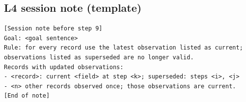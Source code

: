 \subsection{L4 session note (template)}
\begin{small}\begin{Verbatim}[breaklines,breakanywhere,fontsize=\footnotesize]
[Session note before step 9]
Goal: <goal sentence>
Rule: for every record use the latest observation listed as current; observations listed as superseded are no longer valid.
Records with updated observations:
- <record>: current <field> at step <k>; superseded: steps <i>, <j>
- <n> other records observed once; those observations are current.
[End of note]


\end{Verbatim}
\end{small}
